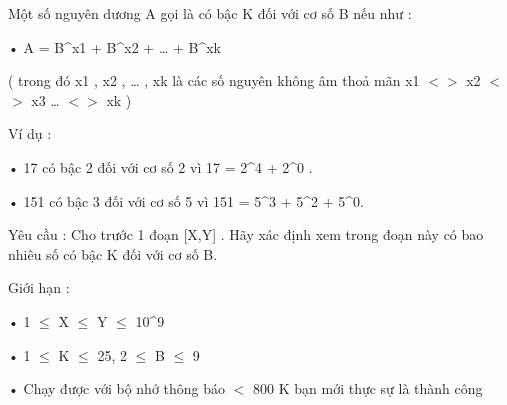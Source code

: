 Một số nguyên dương A gọi là có bậc K đối với cơ số B nếu như :   


   • A = B^x1 + B^x2 + … + B^xk   


   ( trong đó x1 , x2 , … , xk là các số nguyên không âm thoả mãn x1 $<$$>$ x2 $<$$>$ x3 … $<$$>$ xk )   


   Ví dụ :   


   • 17 có bậc 2 đối với cơ số 2 vì 17 = 2^4 + 2^0 .   


   • 151 có bậc 3 đối với cơ số 5 vì 151 = 5^3 + 5^2 + 5^0.   


   Yêu cầu : Cho trước 1 đoạn [X,Y] . Hãy xác định xem trong đoạn này có bao nhiêu số có bậc K đối với cơ số B.   


   Giới hạn :   


   • 1  $\le$  X  $\le$  Y  $\le$  10^9   


   • 1  $\le$  K  $\le$  25, 2  $\le$  B  $\le$  9   


   • Chạy được với bộ nhớ thông báo $<$ 800 K bạn mới thực sự là thành công